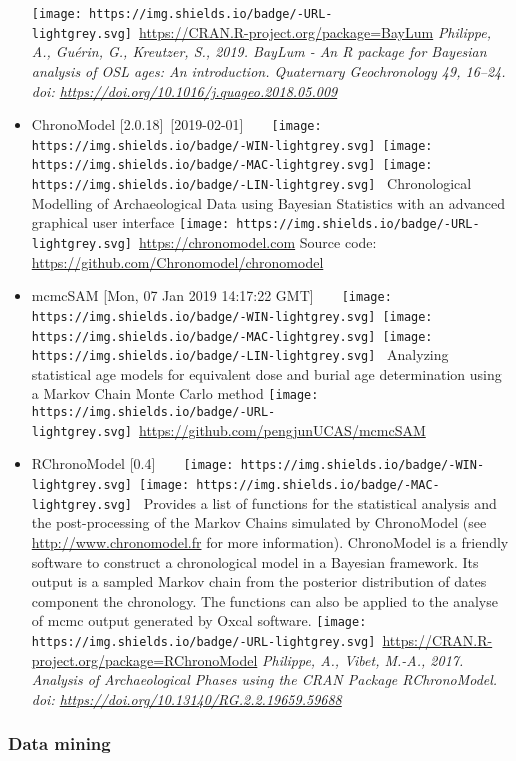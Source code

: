 \documentclass[]{article}
\begin{document}
\begin{itemize}
  \texttt{[image: https://img.shields.io/badge/-URL-lightgrey.svg]}~\url{https://CRAN.R-project.org/package=BayLum}
  \emph{Philippe, A., Guérin, G., Kreutzer, S., 2019. BayLum - An R package for Bayesian analysis of OSL ages: An introduction. Quaternary Geochronology 49, 16--24. doi: \url{https://doi.org/10.1016/j.quageo.2018.05.009}}
\item
  ChronoModel {[}2.0.18{]}~{[}2019-02-01{]}~~~~\texttt{[image: https://img.shields.io/badge/-WIN-lightgrey.svg]}~\texttt{[image: https://img.shields.io/badge/-MAC-lightgrey.svg]}~\texttt{[image: https://img.shields.io/badge/-LIN-lightgrey.svg]}~
  Chronological Modelling of Archaeological Data using Bayesian Statistics with an advanced graphical user interface
  \texttt{[image: https://img.shields.io/badge/-URL-lightgrey.svg]}~\url{https://chronomodel.com}
  \textbar{} Source code: \url{https://github.com/Chronomodel/chronomodel}
\item
  mcmcSAM {[}Mon, 07 Jan 2019 14:17:22 GMT{]}~~~~\texttt{[image: https://img.shields.io/badge/-WIN-lightgrey.svg]}~\texttt{[image: https://img.shields.io/badge/-MAC-lightgrey.svg]}~\texttt{[image: https://img.shields.io/badge/-LIN-lightgrey.svg]}~
  Analyzing statistical age models for equivalent dose and burial age determination using a Markov Chain Monte Carlo method
  \texttt{[image: https://img.shields.io/badge/-URL-lightgrey.svg]}~\url{https://github.com/pengjunUCAS/mcmcSAM}
\item
  RChronoModel {[}0.4{]}~~~~\texttt{[image: https://img.shields.io/badge/-WIN-lightgrey.svg]}~\texttt{[image: https://img.shields.io/badge/-MAC-lightgrey.svg]}~
  Provides a list of functions for the statistical analysis and the post-processing of the Markov Chains simulated by ChronoModel (see \url{http://www.chronomodel.fr} for more information). ChronoModel is a friendly software to construct a chronological model in a Bayesian framework. Its output is a sampled Markov chain from the posterior distribution of dates component the chronology. The functions can also be applied to the analyse of mcmc output generated by Oxcal software.
  \texttt{[image: https://img.shields.io/badge/-URL-lightgrey.svg]}~\url{https://CRAN.R-project.org/package=RChronoModel}
  \emph{Philippe, A., Vibet, M.-A., 2017. Analysis of Archaeological Phases using the CRAN Package RChronoModel. doi: \url{https://doi.org/10.13140/RG.2.2.19659.59688}}
\end{itemize}

\hypertarget{data-mining}{%
\subsubsection{Data mining}\label{data-mining}}
\end{document}
